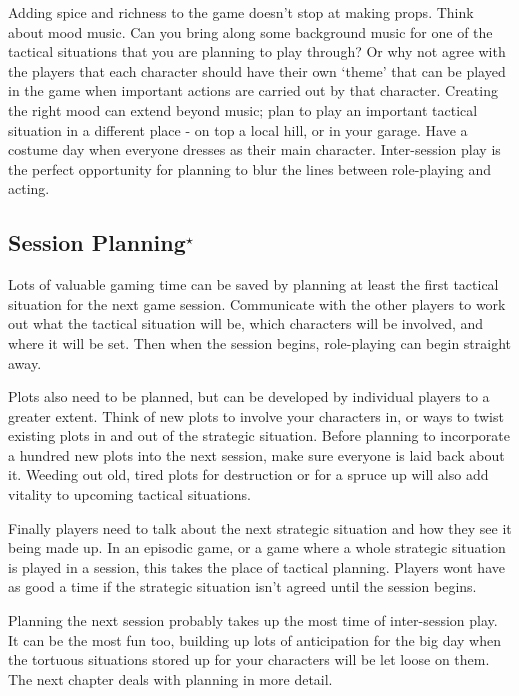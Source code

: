 \documentclass[twoside]{book}
\begin{document}
Adding spice and richness to the game doesn't stop at making
props. Think about mood music. Can you bring along some background
music for one of the tactical situations that you are planning to play
through? Or why not agree with the players that each character should
have their own `theme' that can be played in the game when important
actions are carried out by that character. Creating the right mood can
extend beyond music; plan to play an important tactical situation in a
different place - on top a local hill, or in your garage. Have a
costume day when everyone dresses as their main
character. Inter-session play is the perfect opportunity for planning
to blur the lines between role-playing and acting.

\subsection{Session Planning$^\star$} %

Lots of valuable gaming time can be saved by planning at least the
first tactical situation for the next game session. Communicate with
the other players to work out what the tactical situation will be,
which characters will be involved, and where it will be set. Then when
the session begins, role-playing can begin straight away.

Plots also need to be planned, but can be developed by individual
players to a greater extent. Think of new plots to involve your
characters in, or ways to twist existing plots in and out of the
strategic situation. Before planning to incorporate a hundred new
plots into the next session, make sure everyone is laid back about
it. Weeding out old, tired plots for destruction or for a spruce up
will also add vitality to upcoming tactical situations.

Finally players need to talk about the next strategic situation and
how they see it being made up. In an episodic game, or a game where a
whole strategic situation is played in a session, this takes the place
of tactical planning. Players wont have as good a time if the
strategic situation isn't agreed until the session begins.

Planning the next session probably takes up the most time of
inter-session play. It can be the most fun too, building up lots of
anticipation for the big day when the tortuous situations stored up
for your characters will be let loose on them. The next chapter deals
with planning in more detail.
\end{document}

